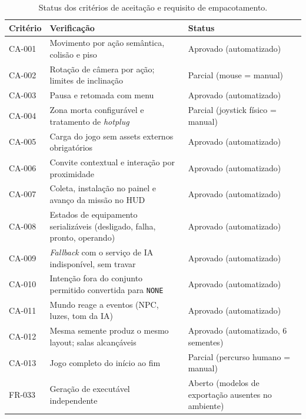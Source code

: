 \begin{table}[htbp]
\centering
\caption{Status dos critérios de aceitação e requisito de empacotamento.}
\label{tab:aceitacao_resumo}
\footnotesize
\begin{tabular}{@{}>{\raggedright\arraybackslash}p{1.5cm} >{\raggedright\arraybackslash}p{8.0cm} >{\raggedright\arraybackslash}p{2.6cm}@{}}
\toprule
Critério & Verificação & Status \\
\midrule
CA-001 & Movimento por ação semântica, colisão e piso & Aprovado (automatizado) \\
CA-002 & Rotação de câmera por ação; limites de inclinação & Parcial (mouse = manual) \\
CA-003 & Pausa e retomada com menu & Aprovado (automatizado) \\
CA-004 & Zona morta configurável e tratamento de \emph{hotplug} & Parcial (joystick físico = manual) \\
CA-005 & Carga do jogo sem assets externos obrigatórios & Aprovado (automatizado) \\
CA-006 & Convite contextual e interação por proximidade & Aprovado (automatizado) \\
CA-007 & Coleta, instalação no painel e avanço da missão no HUD & Aprovado (automatizado) \\
CA-008 & Estados de equipamento serializáveis (desligado, falha, pronto, operando) & Aprovado (automatizado) \\
CA-009 & \emph{Fallback} com o serviço de IA indisponível, sem travar & Aprovado (automatizado) \\
CA-010 & Intenção fora do conjunto permitido convertida para \texttt{NONE} & Aprovado (automatizado) \\
CA-011 & Mundo reage a eventos (NPC, luzes, tom da IA) & Aprovado (automatizado) \\
CA-012 & Mesma semente produz o mesmo layout; salas alcançáveis & Aprovado (automatizado, 6 sementes) \\
CA-013 & Jogo completo do início ao fim & Parcial (percurso humano = manual) \\
FR-033 & Geração de executável independente & Aberto (modelos de exportação ausentes no ambiente) \\
\bottomrule
\end{tabular}
\par\vspace{2pt}{\footnotesize Fonte: elaborado pelo autor (2026), a partir da especificação e da execução da suíte.}
\end{table}
